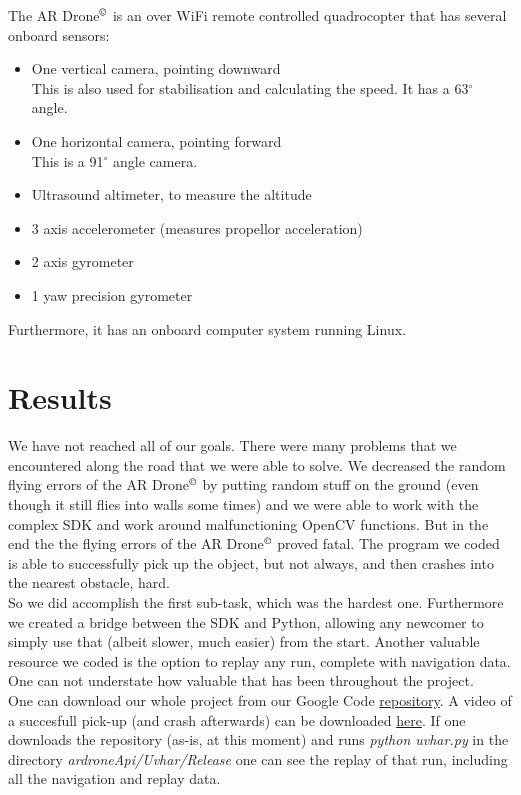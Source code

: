 \documentclass[a4paper,10pt]{article}
\newcommand{\Ardrone}{AR Drone$^{\copyright}$ }
\begin{document}
The \Ardrone is an over WiFi remote controlled quadrocopter that has several onboard sensors:
\begin{itemize}
	\item One vertical camera, pointing downward \\ This is also used for stabilisation and calculating the speed. It has a 63$^{\circ}$ angle.
	\item One horizontal camera, pointing forward \\ This is a 91$^{\circ}$ angle camera.
	\item Ultrasound altimeter, to measure the altitude
    \item 3 axis accelerometer (measures propellor acceleration)
    \item 2 axis gyrometer 
    \item 1 yaw precision gyrometer
\end{itemize}
Furthermore, it has an onboard computer system running Linux. 





\section{Results}
We have not reached all of our goals. There were many problems that we encountered along the road that we were able to solve. We decreased the random flying errors
of the \Ardrone by putting random stuff on the ground (even though it still
flies into walls some times) and we were able to work with the complex SDK and work around
malfunctioning OpenCV functions. But in the end the the flying errors of the
\Ardrone proved fatal. The program we coded is able to successfully pick up the object,
but not always, and then crashes into the nearest obstacle, hard. \\

So we did accomplish the first sub-task, which was the hardest one. Furthermore we created a bridge between the SDK and Python, allowing any newcomer to simply use 
that (albeit slower, much easier) from the start. Another valuable resource we coded is the option to replay any run, complete with navigation data. One can not understate
how valuable that has been throughout the project. \\

One can download our whole project from our Google Code \href{http://code.google.com/p/uvhar/}{repository}. A video of a succesfull pick-up (and crash afterwards) can be 
downloaded \href{http://uvhar.googlecode.com/hg/presentatie/justPIckingUp.3gp}{here}. If one downloads the repository (as-is, at this moment) and runs 
\textit{python uvhar.py} in the directory \textit{ardroneApi/Uvhar/Release} one can see the replay of that run, including all the navigation and replay data. 
\end{document}
